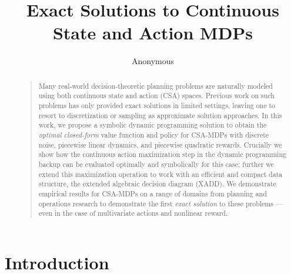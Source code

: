 \documentclass[letterpaper]{article}
\begin{document}
%
\title{Exact Solutions to Continuous State and Action MDPs}
\author{Anonymous}
\maketitle
\begin{abstract}
\begin{quote}
Many real-world decision-theoretic planning problems are naturally
modeled using both continuous state and action (CSA) spaces.  Previous
work on such problems has only provided exact solutions in limited
settings, leaving one to resort to discretization or sampling as
approximate solution approaches.  In this work, we propose a symbolic
dynamic programming solution to obtain the \emph{optimal closed-form}
value function and policy for CSA-MDPs with discrete noise, piecewise
linear dynamics, and piecewise quadratic rewards.  Crucially we show
how the continuous action maximization step in the dynamic programming
backup can be evaluated optimally and symbolically for this case;
further we extend this maximization operation to work with an
efficient and compact data structure, the extended algebraic decision
diagram (XADD).  We demonstrate empirical results for CSA-MDPs on a
range of domains from planning and operations research to demonstrate
the first \emph{exact solution} to these problems --- even in the case
of multivariate actions and nonlinear reward.
\end{quote}
\end{abstract}

\section{Introduction}

\label{sec:intro}
\end{document}
